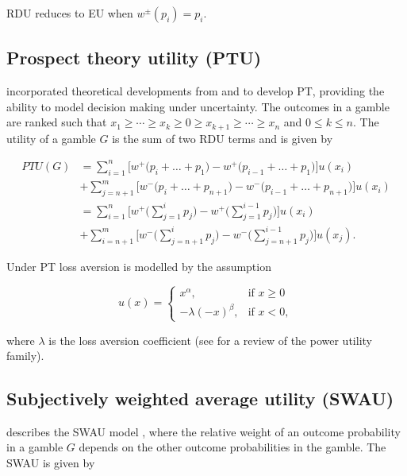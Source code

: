 \documentclass{article}\usepackage[]{graphicx}\usepackage[]{color}
\begin{document}
RDU reduces to EU when $w^\pm(p_i) = p_i$.

\subsection{Prospect theory utility (PTU)}

\cite{Tversky_Kahneman_1992} incorporated theoretical developments from \cite{Gilboa_1987} and \cite{Schmeidler_1989} to develop PT, providing the ability to model decision making under uncertainty. The outcomes in 
a gamble are ranked such that $x_1 \ge \cdots \ge x_k \ge 0 \ge x_{k+1} \ge \cdots \ge x_n$ and $0 \le k \le n$. The utility of a gamble $G$ is the sum of two RDU terms and is given by

\begin{equation}
\begin{split} 
PTU(G) &= \sum_{i=1}^{n} \Bigg[ w^+ \Bigg(p_i + \ldots + p_1\Bigg) - w^+\Bigg(p_{i-1} + \ldots + p_1\Bigg) \Bigg] u(x_i) \\
 & + \sum_{j=n+1}^{m} \Bigg[ w^- \Bigg(p_i + \ldots + p_{n+1}\Bigg) - w^-\Bigg(p_{i-1} + \ldots + p_{n+1}\Bigg) \Bigg] u(x_i)\\
&= \sum_{i=1}^{n} \Bigg[ w^+ \Bigg(\sum_{j=1}^{i} p_j\Bigg) - w^+\Bigg(\sum_{j=1}^{i-1} p_j\Bigg) \Bigg] u(x_i) \\
 & + \sum_{i=n+1}^{m} \Bigg[ w^- \Bigg(\sum_{j=n+1}^{i} p_j\Bigg) - w^-\Bigg(\sum_{j=n+1}^{i-1} p_j\Bigg) \Bigg] u(x_j).
\end{split}
\label{ptu_equation}
\end{equation}

Under PT loss aversion is modelled by the assumption

\begin{equation}
u(x) =
\begin{cases}
x^\alpha, &\text{if $x \geq 0$}\\
-\lambda (-x)^\beta, &\text{if $x < 0$},
\end{cases}
\label{pt_utility_function} 
\end{equation}

where $\lambda$ is the loss aversion coefficient (see \citet[][p. 1336]{Wakker_2008} for a review of the power utility family).

\subsection{Subjectively weighted average utility (SWAU)}

\citet[][p. 35]{Birnbaum_1999} describes the SWAU model \citep*{Karmarkar_1978, Karmarkar_1979, Viscusi_1989, Lattimore_Baker_Witte_1992}, where the relative weight of an outcome probability in a gamble $G$ depends on the other outcome probabilities in the gamble. The SWAU is given by
\end{document}
